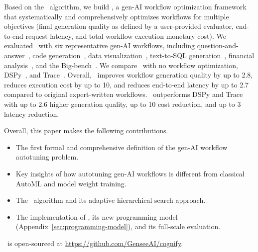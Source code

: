 Based on the \search\ algorithm, we build \textbf{\textit{\sysname}}, a gen-AI workflow optimization framework that systematically and comprehensively optimizes workflows for multiple objectives (final generation quality as defined by a user-provided evaluator, end-to-end request latency, and total workflow execution monetary cost). 
We evaluated \sysname\ with six representative gen-AI workflows, including question-and-answer~\cite{yang2018hotpotqa}, code generation~\cite{humaneval}, data visualization~\cite{datavis}, text-to-SQL generation~\cite{gao2023texttosql}, financial analysis~\cite{finrobot}, and the Big-bench~\cite{bigbench}. We compare \sysname\ with no workflow optimization, DSPy~\cite{DSPy-repo}, and Trace~\cite{Trace}.
Overall, \sysname\ improves workflow generation quality by up to 2.8\x, reduces execution cost by up to 10\x, and reduces end-to-end latency by up to 2.7\x{} compared to original expert-written workflows. \sysname\ outperforms DSPy and Trace with up to 2.6\x{} higher generation quality, up to 10\x{} cost reduction, and up to 3\x{} latency reduction.

Overall, this paper makes the following contributions.

\begin{itemize}
    \item The first formal and comprehensive definition of the gen-AI workflow autotuning problem.
    \item Key insights of how autotuning gen-AI workflows is different from classical AutoML and model weight training.
    \item The \search\ algorithm and its adaptive hierarchical search approach.
    \item The implementation of \sysname, its new programming model (Appendix~\ref{sec:programming-model}), and its full-scale evaluation.
    
\end{itemize}
\sysname\ is open-sourced at \url{https://github.com/GenseeAI/cognify}.
